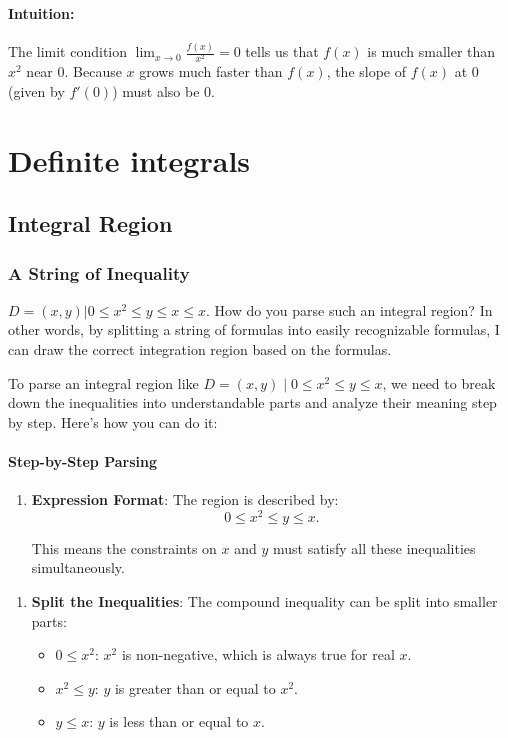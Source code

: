 \documentclass[a4paper,12pt]{book}
\begin{document}
\subsubsection{Intuition:}

The limit condition \(\lim_{x \to 0} \frac{f(x)}{x^2} = 0\) tells us that \( f(x) \) is much smaller than \( x^2 \) near 0. Because \( x \) grows much faster than \( f(x) \), the slope of \( f(x) \) at 0 (given by \( f'(0) \)) must also be 0.

\chapter{Definite integrals}

\section{Integral Region}

\subsection{A String of Inequality}

\(D={ (x,y) | 0 \leq x^2 \leq y \leq x \leq x  }\). How do you parse such an integral region? In other words, by splitting a string of formulas into easily recognizable formulas, I can draw the correct integration region based on the formulas.

To parse an integral region like \( D = { (x, y) \mid 0 \leq x^2 \leq y \leq x } \), we need to break down the inequalities into understandable parts and analyze their meaning step by step. Here’s how you can do it:

\hrulefill

\subsubsection{Step-by-Step Parsing}
\begin{enumerate}
\item 
\textbf{Expression Format}:
The region is described by:
\[
0 \leq x^2 \leq y \leq x.
\]

This means the constraints on \(x\) and \(y\) must satisfy all these inequalities simultaneously.

\end{enumerate}

\hrulefill
\begin{enumerate}
\item 
\textbf{Split the Inequalities}:
The compound inequality can be split into smaller parts:
\begin{itemize}
\item 
\(0 \leq x^2\): \(x^2\) is non-negative, which is always true for real \(x\).

\item 
\(x^2 \leq y\): \(y\) is greater than or equal to \(x^2\).

\item 
\(y \leq x\): \(y\) is less than or equal to \(x\).

\end{itemize}

\end{enumerate}
\end{document}
